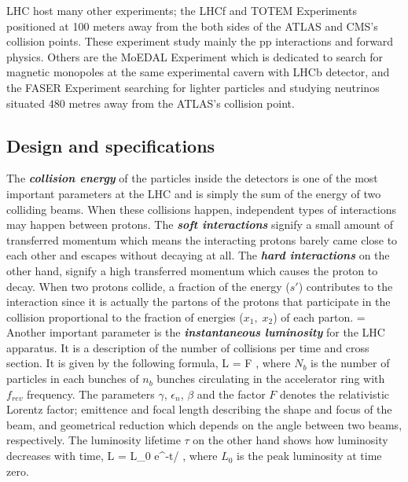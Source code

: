 LHC host many other experiments; the LHCf \cite{LHCF2006} and TOTEM \cite{TOTEM2004} Experiments positioned at 100 meters away from the both sides of the ATLAS and CMS's collision points. These experiment study mainly the pp interactions and forward physics. Others are the MoEDAL\cite{moedal} Experiment which is dedicated to search for magnetic monopoles at the same experimental cavern with LHCb detector, and the FASER Experiment searching for lighter particles and studying neutrinos situated 480 metres away from the ATLAS's collision point.

\subsection{Design and specifications}

The \textbf{\emph{collision energy}} of the particles inside the detectors is one of the most important parameters at the LHC and is simply the sum of the energy of two colliding beams. When these collisions happen, independent types of interactions may happen between protons. The \textbf{\emph{soft interactions}} signify a small amount of transferred momentum which means the interacting protons barely came close to each other and escapes without decaying at all. The \textbf{\emph{hard interactions}} on the other hand, signify a high transferred momentum which causes the proton to decay. When two protons collide, a fraction of the energy ($s\prime$) contributes to the interaction since it is actually the partons of the protons that participate in the collision proportional to the fraction of energies ($x_1,\; x_2$) of each parton.
\be
{} = 
\ee
Another important parameter is the \textbf{\emph{instantaneous luminosity}} for the LHC apparatus. It is a description of the number of collisions per time and cross section. It is given by the following formula,
\be
L = F \; ,
\ee
where $N_b$ is the number of particles in each bunches of $n_b$ bunches circulating in the accelerator ring with $f_{rev}$ frequency. The parameters $\gamma$, $\epsilon_n$, $\beta$ and the factor $F$ denotes the relativistic Lorentz factor; emittence and focal length describing the shape and focus of the beam, and geometrical reduction which depends on the angle between two beams, respectively. The luminosity lifetime $\tau$ on the other hand shows how luminosity decreases with time,
\be
L = L_0 e^{-t/\tau} \; ,
\ee
where $L_0$ is the peak luminosity at time zero.

